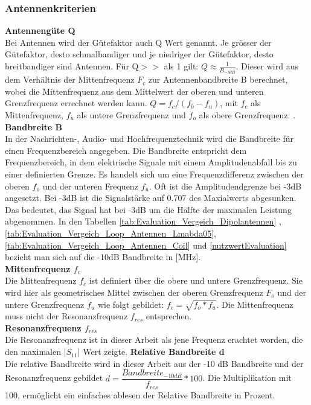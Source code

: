 \subsubsection{Antennenkriterien}
\textbf{Antennengüte Q}\\
Bei Antennen wird der Gütefaktor auch Q Wert genannt. Je grösser der Gütefaktor, desto schmalbandiger und je niedriger der Gütefaktor, desto breitbandiger sind Antennen. Für Q$>>$ als 1 gilt: $Q \approx\frac{1}{B_{-3dB}}$. Dieser wird aus dem Verhältnis der Mittenfrequenz $F_{c}$ zur Antennenbandbreite B berechnet, wobei die Mittenfrequenz aus dem Mittelwert der oberen und unteren Grenzfrequenz errechnet werden kann. $Q = f_c/(f_0-f_u)$, mit $f_c$ als Mittenfrequenz, $f_u$ als untere Grenzfrequenz und $f_o$ als obere Grenzfrequenz. \cite{Guetefaktor_Q}.\\
\textbf{Bandbreite B}\\
In der Nachrichten-, Audio- und Hochfrequenztechnik wird die Bandbreite für einen Frequenzbereich angegeben. Die Bandbreite entspricht dem Frequenzbereich, in dem elektrische Signale mit einem Amplitudenabfall bis zu einer definierten Grenze. Es handelt sich um eine Frequenzdifferenz zwischen der oberen $f_o$ und der unteren Frequenz $f_u$. Oft ist die Amplitudendgrenze bei -3dB angesetzt. Bei -3dB ist die Signalstärke auf 0.707 des Maxialwerts abgesunken. Das bedeutet, das Signal hat bei -3dB um die Hälfte der maximalen Leistung abgenommen\cite{Bandbreite_B}.
In den Tabellen \ref{tab:Evaluation_Vergeich_Dipolantennen} ,\ref{tab:Evaluation_Vergeich_Loop_Antennen_Lmabda05}, \ref{tab:Evaluation_Vergeich_Loop_Antennen_Coil} und \ref{nutzwertEvaluation} bezieht man sich auf die -10dB Bandbreite in [MHz].\\
\textbf{Mittenfrequenz $f_{c}$}\\
Die Mittenfrequenz $f_c$ ist definiert über die obere und untere Grenzfrequenz. Sie wird hier als geometrisches Mittel zwischen der oberen Grenzfrequenz $F_o$ und der untere Grenzfrequenz $f_u$ wie folgt gebildet: $f_c=\sqrt{f_o*f_u}$. Die Mittenfrequenz muss nicht der Resonanzfrequenz $f_{res}$ entsprechen.\\
\textbf{Resonanzfrequenz $f_{res}$}\\
Die Resonanzfrequenz ist in dieser Arbeit als jene Frequenz erachtet worden, die den maximalen |$S_{11}$| Wert zeigte.
\textbf{Relative Bandbreite d}\\
Die relative Bandbreite wird in dieser Arbeit aus der -10 dB Bandbreite und der  
Resonanzfrequenz gebildet $d=\dfrac{Bandbreite_{-10dB}}{f_{res}}*100$. Die Multiplikation mit 100, ermöglicht ein einfaches ablesen der Relative Bandbreite in Prozent. \\
